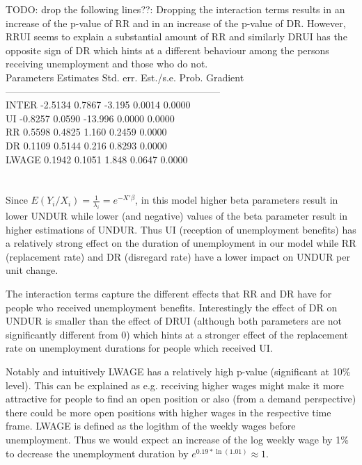 \documentclass[11pt]{article}
\theoremstyle{break}
\begin{document}
TODO: drop the following lines??: Dropping the interaction terms results in an increase of the p-value of RR and in an increase of the p-value of DR. However, RRUI seems to explain a substantial amount of RR and similarly DRUI has the opposite sign of DR which hints at a different behaviour among the persons receiving unemployment and those who do not.  \\
Parameters    Estimates     Std. err.  Est./s.e.  Prob.    Gradient \\
------------------------------------------------------------------ \\
INTER           -2.5134        0.7867   -3.195   0.0014      0.0000 \\
UI              -0.8257        0.0590  -13.996   0.0000      0.0000 \\
RR               0.5598        0.4825    1.160   0.2459      0.0000 \\
DR               0.1109        0.5144    0.216   0.8293      0.0000 \\
LWAGE            0.1942        0.1051    1.848   0.0647      0.0000 \\
\\
\\

Since $E(Y_i/X_i) = \frac{1}{\lambda_i} = e^{-X'\beta}$, in this model higher beta parameters result in lower UNDUR while lower (and negative) values of the beta parameter result in higher estimations of UNDUR.
Thus UI (reception of unemployment benefits) has a relatively strong effect on the duration of unemployment in our model while RR (replacement rate) and DR (disregard rate) have a lower impact on UNDUR per unit change.

The interaction terms capture the different effects that RR and DR have for people who received unemployment benefits. Interestingly the effect of DR on UNDUR is smaller than the effect of DRUI (although both parameters are not significantly different from 0) which hints at a stronger effect of the replacement rate on unemployment durations for people which received UI.

Notably and intuitively LWAGE has a relatively high p-value (significant at 10\% level). This can be explained as e.g. receiving higher wages might make it more attractive for people to find an open position or also (from a demand perspective) there could be more open positions with higher wages in the respective time frame. LWAGE is defined as the logithm of the weekly wages before unemployment. Thus we would expect an increase of the log weekly wage by 1\% to decrease the unemployment duration by $e^{0.19*\ln(1.01)} \approx 1$.
\end{document}
